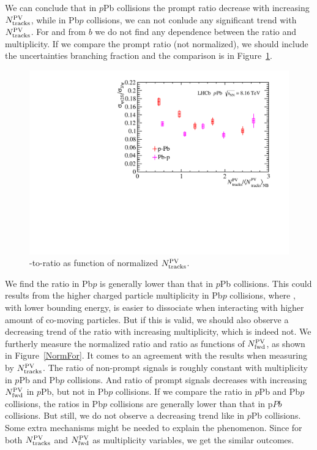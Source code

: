 We can conclude that in $p$Pb collisions the prompt ratio decrease with increasing $N_{\rm tracks}^{\rm PV}$, while in Pb$p$ collisions, we can not conlude any significant trend with $N_{\rm tracks}^{\rm PV}$. For \jpsi and \psitwos from $b$ we do not find any dependence between the ratio and multiplicity.
If we compare the prompt ratio (not normalized), we should include the uncertainties branching fraction and the comparison is in Figure~\ref{ComparePVN}.
\begin{figure}[H]
\begin{center}
\includegraphics[width=0.7\linewidth]{pdf/pPb/Workdir/Result/Norm.pdf}
\end{center}
\caption{\psitwos-to-\jpsi ratio as function of normalized $N_{\rm tracks}^{\rm PV}$.}
\label{ComparePVN}
\end{figure}
We find the ratio in Pb$p$ is generally lower than that in $p$Pb collisions. This could results from the higher charged particle multiplicity in Pb$p$ collisions, where \psitwos, with lower bounding energy, is easier to dissociate when interacting with higher amount of co-moving particles. But if this is valid, we should also observe a decreasing trend of the ratio with increasing multiplicity, which is indeed not.
We furtherly measure the normalized ratio and ratio as functions of $N_{\rm fwd}^{\rm PV}$, as shown in Figure~\ref{NormFor}. It comes to an agreement with the results when measuring by $N_{\rm tracks}^{\rm PV}$. The ratio of non-prompt signals is roughly constant with multiplicity in $p$Pb and Pb$p$ collisions. And ratio of prompt signals decreases with increasing $N_{\rm fwd}^{\rm PV}$ in $p$Pb, but not in Pb$p$ collisions. 
If we compare the ratio in $p$Pb and Pb$p$ collisions, the ratios in Pb$p$ collisions are generally lower than that in p$Pb$ collisions. But still, we do not observe a decreasing trend like in $p$Pb collisions. Some extra mechanisms might be needed to explain the phenomenon. Since for both $N_{\rm tracks}^{\rm PV}$ and $N_{\rm fwd}^{\rm PV}$ as multiplicity variables, we get the similar outcomes.
